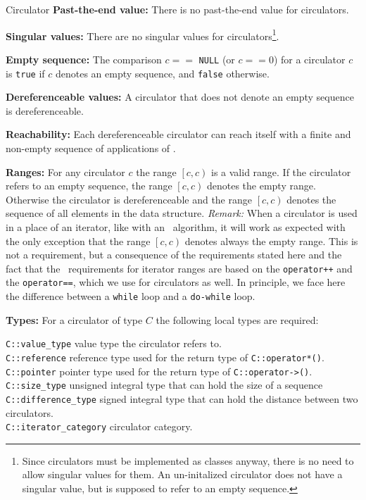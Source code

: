 \begin{ccRefConcept}{Circulator}
{\bf Past-the-end value:} There is no past-the-end value for circulators.

{\bf Singular values:} There are no singular values for
circulators\footnote{Since circulators must be implemented as classes
  anyway, there is no need to allow singular values for them. An
  un-initalized circulator does not have a singular value, but is
  supposed to refer to an empty sequence.}.

{\bf Empty sequence:} The comparison $c ==$ {\tt NULL} (or $c == 0$)
for a circulator $c$ is {\tt true} if $c$ denotes an empty sequence,
and {\tt false} otherwise.

{\bf Dereferenceable values:} A circulator that does not denote an
empty sequence is dereferenceable.

{\bf Reachability:} Each dereferenceable circulator can reach itself
with a finite and non-empty sequence of applications of .

{\bf Ranges:} For any circulator $c$ the range $\left[c, c\right)$ is
a valid range. If the circulator refers to an empty sequence, the range
$\left[c, c\right)$ denotes the empty range. Otherwise the circulator
is dereferenceable and the range $\left[c, c\right)$ denotes the
sequence of all elements in the data structure. {\em Remark:} When a
circulator is used in a place of an iterator, like with an \stl\ 
algorithm, it will work as expected with the only exception that
the range $\left[c, c\right)$ denotes always the empty range. This is
not a requirement, but a consequence of the requirements
stated here and the fact that the \stl\ requirements for iterator
ranges are based on the {\tt operator++} and the {\tt operator==},
which we use for circulators as well. In principle, we face here the 
difference between a {\tt while} loop and a {\tt do-while} loop.

{\bf Types:} For a circulator of type $C$ the following local types
are required: 

\begin{tabbing}
    {\tt C::value\_type}        \>  value type the circulator refers to.\\
    {\tt C::reference}          \>  reference type used for the return type
                                    of {\tt C::operator*()}.\\
    {\tt C::pointer}            \>  pointer type used for the return type of 
                                    {\tt  C::operator->()}.\\
    {\tt C::size\_type}         \>  unsigned integral type that can hold 
                                    the size of a sequence\\
    {\tt C::difference\_type}   \>  signed integral type that can hold 
                                    the distance between two circulators.\\
    {\tt C::iterator\_category} \>  circulator category.
\end{tabbing}


\end{ccRefConcept}
